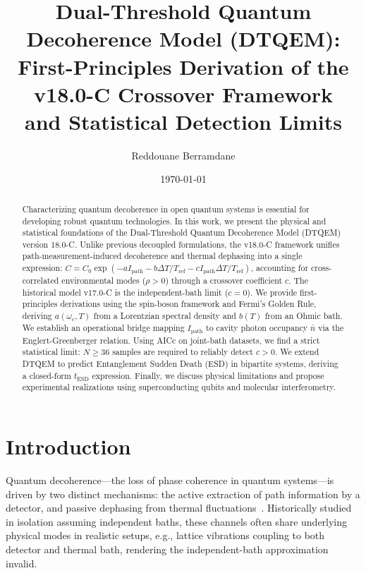 \documentclass[reprint,amsmath,amssymb,aps,pra,superscriptaddress]{revtex4-2}
\begin{document}
\title{Dual-Threshold Quantum Decoherence Model (DTQEM): \\ 
       First-Principles Derivation of the v18.0-C Crossover Framework \\
       and Statistical Detection Limits}

\author{Reddouane Berramdane}

\date{\today}

\begin{abstract}
Characterizing quantum decoherence in open quantum systems is essential for developing robust quantum technologies. In this work, we present the physical and statistical foundations of the Dual-Threshold Quantum Decoherence Model (DTQEM) version 18.0-C. Unlike previous decoupled formulations, the v18.0-C framework unifies path-measurement-induced decoherence and thermal dephasing into a single expression: $C = C_0 \exp(-a I_{\text{path}} - b \Delta T/T_{\text{ref}} - c I_{\text{path}} \Delta T/T_{\text{ref}})$, accounting for cross-correlated environmental modes ($\rho > 0$) through a crossover coefficient $c$. The historical model v17.0-C is the independent-bath limit ($c = 0$). We provide first-principles derivations using the spin-boson framework and Fermi's Golden Rule, deriving $a(\omega_c,T)$ from a Lorentzian spectral density and $b(T)$ from an Ohmic bath. We establish an operational bridge mapping $I_{\text{path}}$ to cavity photon occupancy $\bar{n}$ via the Englert-Greenberger relation. Using AICc on joint-bath datasets, we find a strict statistical limit: $N \ge 36$ samples are required to reliably detect $c > 0$. We extend DTQEM to predict Entanglement Sudden Death (ESD) in bipartite systems, deriving a closed-form $t_{\text{ESD}}$ expression. Finally, we discuss physical limitations and propose experimental realizations using superconducting qubits and molecular interferometry.
\end{abstract}

\maketitle

\section{Introduction}

Quantum decoherence---the loss of phase coherence in quantum systems---is driven by two distinct mechanisms: the active extraction of path information by a detector, and passive dephasing from thermal fluctuations~\cite{breuer2002}. Historically studied in isolation assuming independent baths, these channels often share underlying physical modes in realistic setups, e.g., lattice vibrations coupling to both detector and thermal bath, rendering the independent-bath approximation invalid.
\end{document}
